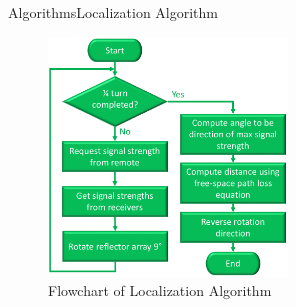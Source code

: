 \documentclass{beamer}
\begin{document}
\begin{frame}{Algorithms}{Localization Algorithm}
  \begin{figure}
    \centering
    \includegraphics[height=2.5in]{figs/localizationAlgorithmFlowchart.pdf}
    \caption{Flowchart of Localization Algorithm}
  \end{figure}
\end{frame}
\end{document}
